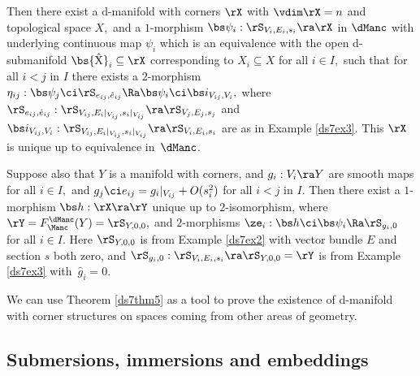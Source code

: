 \documentclass{article}
\begin{document}
\begin{thm}
Then there exist a d-manifold with corners\/ $\rX$ with\/
$\vdim\rX=n$ and topological space $X,$ and a $1$-morphism
$\bs\psi_i:\rS_{V_i,E_i,s_i}\ra\rX$ in $\dManc$ with underlying
continuous map $\psi_i$ which is an equivalence with the open
d-submanifold\/ $\bs{\hat{\rm X}}_i\subseteq\rX$ corresponding to
$\hat X_i\subseteq X$ for all\/ $i\in I,$ such that for all\/ $i<j$
in $I$ there exists a $2$-morphism\/
$\eta_{ij}:\bs\psi_j\ci\rS_{e_{ij},\hat e_{ij}}\Ra\bs\psi_i\ci\bs
i_{V_{ij},V_i},$ where $\rS_{e_{ij},\hat
e_{ij}}:\rS_{V_{ij},E_i\vert_{V_{ij}},
s_i\vert_{V_{ij}}}\ra\rS_{V_j,E_j,s_j}$ and\/ $\bs i_{V_{ij},V_i}:
\rS_{V_{ij},E_i\vert_{V_{ij}}, s_i\vert_{V_{ij}}}\ra
\rS_{V_i,E_i,s_i}$ are as in Example\/ {\rm\ref{ds7ex3}}. This\/
$\rX$ is unique up to equivalence in~$\dManc$.

Suppose also that\/ $Y$ is a manifold with corners, and\/
$g_i:V_i\ra Y$ are smooth maps for all\/ $i\in I,$ and\/ $g_j\ci
e_{ij}=g_i\vert_{V_{ij}}+O(s_i^2)$ for all\/ $i<j$ in $I$. Then
there exist a $1$-morphism $\bs h:\rX\ra\rY$ unique up to
$2$-isomorphism, where $\rY=F_\Manc^\dManc(Y)=\rS_{Y,0,0},$ and\/
$2$-morphisms $\ze_i:\bs h\ci\bs\psi_i\Ra\rS_{g_i,0}$ for all\/
$i\in I$. Here $\rS_{Y,0,0}$ is from Example\/ {\rm\ref{ds7ex2}}
with vector bundle $E$ and section $s$ both zero, and\/
$\rS_{g_i,0}:\rS_{V_i,E_i,s_i}\ra\rS_{Y,0,0}=\rY$ is from Example
{\rm\ref{ds7ex3}} with\/~$\hat g_i=0$.
\label{ds7thm5}
\end{thm}

We can use Theorem \ref{ds7thm5} as a tool to prove the existence of
d-manifold with corner structures on spaces coming from other areas
of geometry.

\subsection{Submersions, immersions and embeddings}
\label{ds74}
\end{document}

